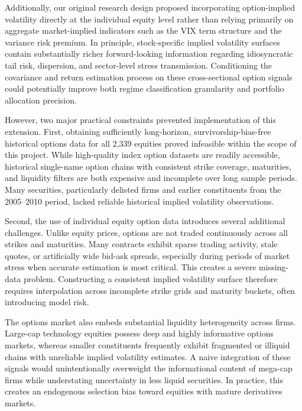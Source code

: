 \documentclass[12pt]{article}
\begin{document}
Additionally, our original research design proposed incorporating option-implied volatility directly at the individual equity level rather than relying primarily on aggregate market-implied indicators such as the VIX term structure and the variance risk premium. In principle, stock-specific implied volatility surfaces contain substantially richer forward-looking information regarding idiosyncratic tail risk, dispersion, and sector-level stress transmission. Conditioning the covariance and return estimation process on these cross-sectional option signals could potentially improve both regime classification granularity and portfolio allocation precision.

However, two major practical constraints prevented implementation of this extension. First, obtaining sufficiently long-horizon, survivorship-bias-free historical options data for all 2,339 equities proved infeasible within the scope of this project. While high-quality index option datasets are readily accessible, historical single-name option chains with consistent strike coverage, maturities, and liquidity filters are both expensive and incomplete over long sample periods. Many securities, particularly delisted firms and earlier constituents from the 2005--2010 period, lacked reliable historical implied volatility observations.

Second, the use of individual equity option data introduces several additional challenges. Unlike equity prices, options are not traded continuously across all strikes and maturities. Many contracts exhibit sparse trading activity, stale quotes, or artificially wide bid-ask spreads, especially during periods of market stress when accurate estimation is most critical. This creates a severe missing-data problem. Constructing a consistent implied volatility surface therefore requires interpolation across incomplete strike grids and maturity buckets, often introducing model risk.

The options market also embeds substantial liquidity heterogeneity across firms. Large-cap technology equities possess deep and highly informative options markets, whereas smaller constituents frequently exhibit fragmented or illiquid chains with unreliable implied volatility estimates. A naive integration of these signals would unintentionally overweight the informational content of mega-cap firms while understating uncertainty in less liquid securities. In practice, this creates an endogenous selection bias toward equities with mature derivatives markets.
\end{document}

